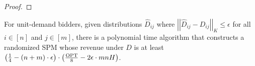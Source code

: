 \begin{proof}
	
	\end{proof}


\begin{theorem}\label{thm:UD Kolmogorov}
For unit-demand bidders, given distributions $\hat{D}_{ij}$ where $\left|\left|\hat{D}_{ij}-D_{ij}\right|\right|_K\leq \epsilon$ for all $i\in[n]$ and $j\in[m]$, there is a polynomial time algorithm that constructs a randomized SPM whose revenue under $D$ is at least $\left(\frac{1}{4}-(n+m)\cdot \epsilon\right)\cdot\left(\frac{\text{OPT}}{8}-2\epsilon\cdot mnH\right)$.
\end{theorem}

